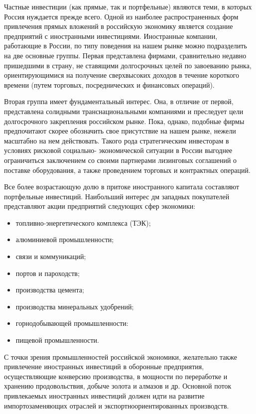 Частные инвестиции (как прямые, так и портфельные) являются теми, в которых Россия нуждается прежде всего. Одной из наиболее распространенных форм привлечения прямых вложений в российскую экономику является создание предприятий с иностранными инвестициями. Иностранные компании, работающие в России, по типу поведения на нашем рынке можно подразделить на две основные группы. Первая представлена фирмами, сравнительно недавно пришедшими в страну, не ставящими долгосрочных целей по завоеванию рынка, ориентирующимися на получение сверхвысоких доходов в течение короткого времени (путем торговых, посреднических и финансовых операций).

Вторая группа имеет фундаментальный интерес. Она, в отличие от первой, представлена солидными транснациональными компаниями и преследует цели долгосрочного закрепления российском рынке. Пока, однако, подобные фирмы предпочитают скорее обозначить свое присутствие на нашем рынке, нежели масштабно на нем действовать. Такого рода стратегическим инвесторам в условиях рисковой социально- экономической ситуации в России выгоднее ограничиться заключением со своими партнерами лизинговых соглашений о поставке оборудования, а также проведением торговых и контрактных операций.

Все более возрастающую долю в притоке иностранного капитала составляют портфельные инвестиций. Наибольший интерес дм западных покупателей представляют акции предприятий следующих сфер экономики:
\begin{itemize}
	\item топливно-энергетического комплекса (ТЭК);
\item алюминиевой промышленности;
\item связи и коммуникаций;
\item портов и пароходств;
\item производства цемента;
\item производства минеральных удобрений;
\item горнодобывающей промышленности:
\item пищевой промышленности.
\end{itemize}

С точки зрения промышленностей российской экономики, желательно также привлечение иностранных инвестиций в оборонные предприятия, осуществляющие конверсию производства, в мощности по переработке и хранению продовольствия, добыче золота и алмазов и др. Основной поток привлекаемых иностранных инвестиций должен идти на развитие импортозаменяющих отраслей и экспортноориентированных производств.

